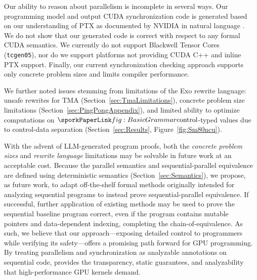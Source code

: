 
Our ability to reason about parallelism is incomplete in several ways.
Our programming model and output CUDA synchronization code is generated based on our understanding of PTX as documented by NVIDIA in natural language \cite{ptx}.
We do not show that our generated code is correct with respect to any formal CUDA semantics.
We currently do not support Blackwell Tensor Cores (\texttt{tcgen05}),
nor do we support platforms not providing CUDA C++ and inline PTX support.
Finally, our current synchronization checking approach
supports only concrete problem sizes and limits compiler performance.

We further noted issues stemming from limitations of the Exo rewrite language:
unsafe rewrites for TMA (Section~\ref{sec:TmaLimitations}),
concrete problem size limitations (Section~\ref{sec:PingPongAppendix}),
and limited ability to optimize computations on $\sporkcontrol$-typed values
due to control-data separation (Section~\ref{sec:Results}, Figure~\ref{fig:Sm80ncu}).

With the advent of LLM-generated program proofs,
both the \emph{concrete problem sizes} and \emph{rewrite language}
limitations may be solvable in future work at an acceptable cost.
Because the parallel semantics and sequential-parallel equivalence are defined using deterministic semantics
(Section~\ref{sec:Semantics}),
we propose, as future work, to adapt off-the-shelf formal methods originally intended
for analyzing sequential programs to instead prove sequential-parallel equivalence.
If successful, further application of existing methods may be used to prove the sequential baseline program correct,
even if the program contains mutable pointers and data-dependent indexing, completing the chain-of-equivalence.
As such,
we believe that our approach---exposing detailed control to programmers while verifying its safety---offers a promising path forward for GPU programming.
By treating parallelism and synchronization as analyzable annotations on sequential code,
\sporkName{} provides the transparency, static guarantees, and analyzability that high-performance GPU kernels demand.
